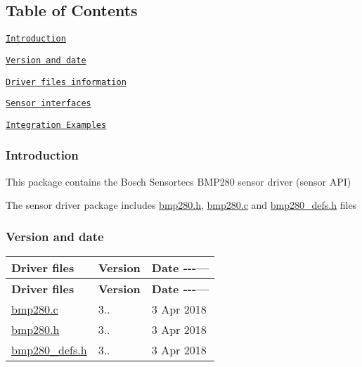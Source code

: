 \subsection*{Table of Contents}


\begin{DoxyItemize}
\item \href{#Intro}{\tt Introduction}
\item \href{#Ver}{\tt Version and date}
\item \href{#file}{\tt Driver files information}
\item \href{#interface}{\tt Sensor interfaces}
\item \href{#examples}{\tt Integration Examples}
\end{DoxyItemize}

\subsubsection*{Introduction\label{_Intro}%
}

This package contains the Bosch Sensortec\textquotesingle{}s B\+M\+P280 sensor driver (sensor A\+PI)

The sensor driver package includes \mbox{\hyperlink{bmp280_8h}{bmp280.\+h}}, \mbox{\hyperlink{bmp280_8c}{bmp280.\+c}} and \mbox{\hyperlink{bmp280__defs_8h}{bmp280\+\_\+defs.\+h}} files

\subsubsection*{Version and date\label{_Ver}%
}

\tabulinesep=1mm
\begin{longtabu} spread 0pt [c]{*{3}{|X[-1]}|}
\hline
\rowcolor{\tableheadbgcolor}\textbf{ Driver files  }&\textbf{ Version  }&\textbf{ Date -\/-\/-\/---   }\\
\endfirsthead
\hline
\endfoot
\hline
\rowcolor{\tableheadbgcolor}\textbf{ Driver files  }&\textbf{ Version  }&\textbf{ Date -\/-\/-\/---   }\\
\endhead
\mbox{\hyperlink{bmp280_8c}{bmp280.\+c}}  &3..  &3 Apr 2018   \\
\mbox{\hyperlink{bmp280_8h}{bmp280.\+h}}  &3..  &3 Apr 2018   \\
\mbox{\hyperlink{bmp280__defs_8h}{bmp280\+\_\+defs.\+h}}  &3..  &3 Apr 2018   \\
\end{longtabu}


